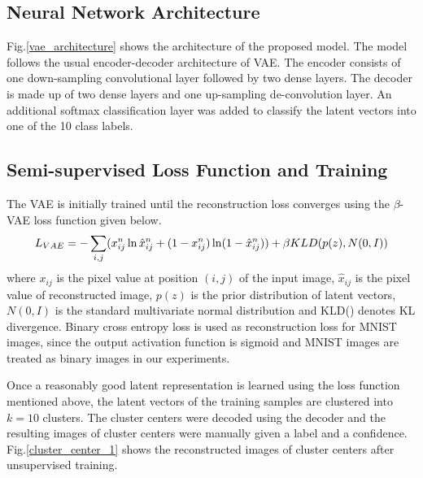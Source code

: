 \documentclass[runningheads]{llncs}
\begin{document}
\subsection{Neural Network Architecture}
Fig.\ref{vae_architecture} shows the architecture of the proposed model.
The model follows the usual encoder-decoder architecture of VAE.
The encoder consists of one down-sampling convolutional layer followed by two dense layers.
The decoder is made up of two dense layers and one up-sampling de-convolution layer.
An additional softmax classification layer was added to classify the latent vectors into one of the 10 class labels.

\subsection{Semi-supervised Loss Function and Training}\label{section_loss_function}
The VAE is initially trained until the reconstruction loss converges using the $\beta$-VAE loss function\cite{beta_vae} given below.
\begin{equation} \label{vae_loss_eqn}
L_{VAE} = -\sum_{i, j}(x_{ij}^n \ln \hat{x}_{ij}^n
+ (1 - x_{ij}^n) \ln(1 -  \hat{x}_{ij}^n ) )\\
    +\beta KLD(p(z), N(0,I))
\end{equation}
where   $x_{ij}$ is the pixel value at position $(i, j)$ of the input image, $\hat{x}_{ij}$ is the pixel value of reconstructed image, $p(z)$ is the prior distribution of latent vectors, $N(0,I)$ is the standard multivariate normal distribution and KLD() denotes KL divergence.
Binary cross entropy loss is used as reconstruction loss for MNIST images, since the output activation function is sigmoid and MNIST images are treated as binary images in our experiments.

Once a reasonably good latent representation is learned using the loss function mentioned above, the latent vectors of the training samples are clustered into $k=10$ clusters.
The cluster centers were decoded using the decoder  and the resulting images of cluster centers were manually given a label and a confidence.
Fig.\ref{cluster_center_1} shows the reconstructed images of cluster centers after unsupervised training.
\end{document}

